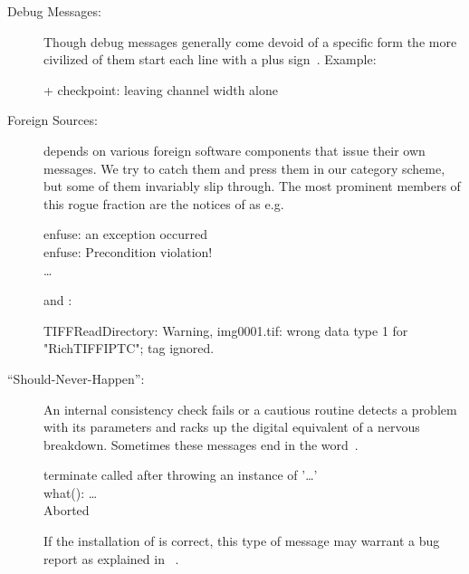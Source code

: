 \begin{description}
\item[Debug Messages:] Though debug messages generally come devoid of a specific form the more
  civilized of them start each line with a plus sign~\sample{+}.  Example:

  \begin{literal}
    + checkpoint: leaving channel width alone
  \end{literal}

\item[Foreign Sources:] \appcmd{} depends on various foreign software components that issue
  their own messages.  We try to catch them and press them in our category scheme, but some of
  them invariably slip through.  The most prominent members of this rogue fraction are the
  notices of  as e.g.

  \begin{literal}
    enfuse: an exception occurred \\
    enfuse: Precondition violation! \\
    \dots
  \end{literal}

  and :

  \begin{literal}
    TIFFReadDirectory: Warning, img0001.tif: wrong data type 1 for "RichTIFFIPTC"; tag ignored.
  \end{literal}

\item[``Should-Never-Happen'':] An internal consistency check fails or a cautious routine
  detects a problem with its parameters and racks up the digital equivalent of a nervous
  breakdown.  Sometimes these messages end in the word~.

  \begin{literal}
    terminate called after throwing an instance of '\dots' \\
    what(): \dots \\
    Aborted
  \end{literal}

  If the installation of \appcmd{} is correct, this type of message may warrant a bug report as
  explained in \appendixName~.
\end{description}

